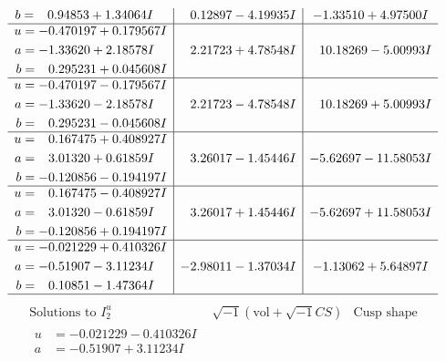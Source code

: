 \documentclass[1p]{elsarticle_modified}
\theoremstyle{definition}
\newcommand{\I}{\sqrt{-1}}
\begin{document}
$$\begin{array}{c|c|c}
\begin{aligned}
b &= \phantom{-}0.94853 + 1.34064 I\end{aligned}
 & \phantom{-}0.12897 - 4.19935 I & -1.33510 + 4.97500 I \\ \hline\begin{aligned}
u &= -0.470197 + 0.179567 I \\
a &= -1.33620 + 2.18578 I \\
b &= \phantom{-}0.295231 + 0.045608 I\end{aligned}
 & \phantom{-}2.21723 + 4.78548 I & \phantom{-}10.18269 - 5.00993 I \\ \hline\begin{aligned}
u &= -0.470197 - 0.179567 I \\
a &= -1.33620 - 2.18578 I \\
b &= \phantom{-}0.295231 - 0.045608 I\end{aligned}
 & \phantom{-}2.21723 - 4.78548 I & \phantom{-}10.18269 + 5.00993 I \\ \hline\begin{aligned}
u &= \phantom{-}0.167475 + 0.408927 I \\
a &= \phantom{-}3.01320 + 0.61859 I \\
b &= -0.120856 - 0.194197 I\end{aligned}
 & \phantom{-}3.26017 - 1.45446 I & -5.62697 - 11.58053 I \\ \hline\begin{aligned}
u &= \phantom{-}0.167475 - 0.408927 I \\
a &= \phantom{-}3.01320 - 0.61859 I \\
b &= -0.120856 + 0.194197 I\end{aligned}
 & \phantom{-}3.26017 + 1.45446 I & -5.62697 + 11.58053 I \\ \hline\begin{aligned}
u &= -0.021229 + 0.410326 I \\
a &= -0.51907 - 3.11234 I \\
b &= \phantom{-}0.10851 - 1.47364 I\end{aligned}
 & -2.98011 - 1.37034 I & -1.13062 + 5.64897 I\\
 \hline 
 \end{array}$$\newpage$$\begin{array}{c|c|c}  
\text{Solutions to }I^u_{2}& \I (\text{vol} + \sqrt{-1}CS) & \text{Cusp shape}\\
 \hline 
\begin{aligned}
u &= -0.021229 - 0.410326 I \\
a &= -0.51907 + 3.11234 I \\

\end{aligned}
\end{array}$$
\end{document}
